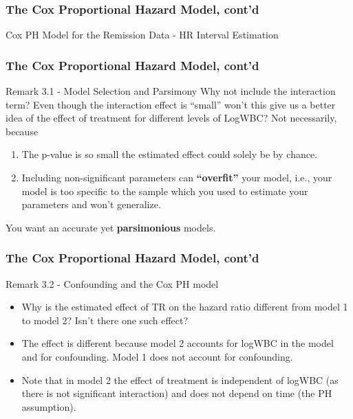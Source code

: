 \documentclass{beamer}
\theoremstyle{definition}
\begin{document}
\begin{frame} 
\frametitle{The Cox Proportional Hazard Model, cont'd}
\begin{block}{Cox PH Model for the Remission Data - HR Interval Estimation} 









\begin{frame}
\frametitle{The Cox Proportional Hazard Model, cont'd}
\begin{block}{Remark 3.1 - Model Selection and Parsimony}
Why not include the interaction term? Even though the interaction effect is ``small'' won't this give us a better idea of the effect of treatment for different levels of LogWBC? Not necessarily, because
\begin{enumerate}
\item The p-value is so small the estimated effect could solely be by chance.
\item Including non-significant parameters can \textbf{``overfit''} your model, i.e., your model is too specific to the sample which you used to estimate your parameters and won't generalize.
\end{enumerate}
You want an accurate yet \textbf{parsimonious} models.
\end{block}
\end{frame}

\begin{frame}
\frametitle{The Cox Proportional Hazard Model, cont'd}
\begin{block}{Remark 3.2 - Confounding and the Cox PH model}
\begin{itemize}
\item  Why is the estimated effect of TR on the hazard ratio different from model 1 to model 2? Isn't there one such effect?
\item The effect is different because model 2 accounts for logWBC in the model and for confounding.  Model 1 does not account for confounding.
\item Note that in model 2 the effect of treatment is independent of logWBC (as there is not significant interaction) and does not depend on time (the PH assumption).
\end{itemize}
\end{block}
\end{frame}


\end{block}
\end{frame}
\end{document}
